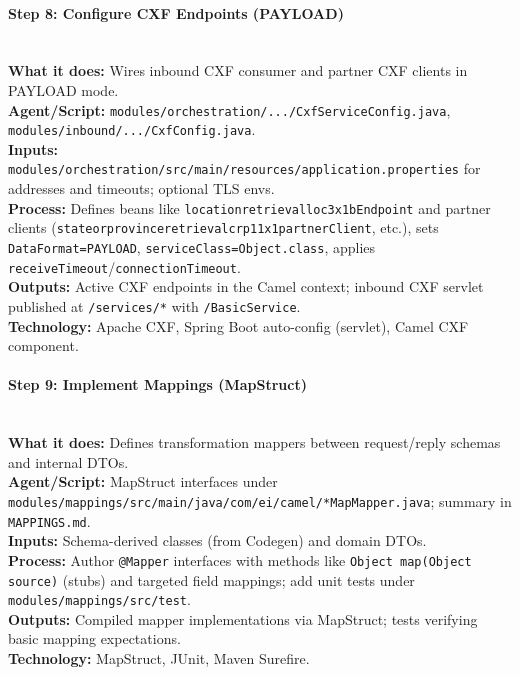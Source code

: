 \documentclass[11pt,a4paper]{article}
\begin{document}
\paragraph{Step 8: Configure CXF Endpoints (PAYLOAD)} \hfill\\
\textbf{What it does:} Wires inbound CXF consumer and partner CXF clients in PAYLOAD mode.\\
\textbf{Agent/Script:} \texttt{modules/orchestration/.../CxfServiceConfig.java}, \texttt{modules/inbound/.../CxfConfig.java}.\\
\textbf{Inputs:} \texttt{modules/orchestration/src/main/resources/application.properties} for addresses and timeouts; optional TLS envs.\\
\textbf{Process:} Defines beans like \texttt{locationretrievalloc3x1bEndpoint} and partner clients (\texttt{stateorprovinceretrievalcrp11x1partnerClient}, etc.), sets \texttt{DataFormat=PAYLOAD}, \texttt{serviceClass=Object.class}, applies \texttt{receiveTimeout}/\texttt{connectionTimeout}.\\
\textbf{Outputs:} Active CXF endpoints in the Camel context; inbound CXF servlet published at \texttt{/services/*} with \texttt{/BasicService}.\\
\textbf{Technology:} Apache CXF, Spring Boot auto-config (servlet), Camel CXF component.

\paragraph{Step 9: Implement Mappings (MapStruct)} \hfill\\
\textbf{What it does:} Defines transformation mappers between request/reply schemas and internal DTOs.\\
\textbf{Agent/Script:} MapStruct interfaces under \texttt{modules/mappings/src/main/java/com/ei/camel/*MapMapper.java}; summary in \texttt{MAPPINGS.md}.\\
\textbf{Inputs:} Schema-derived classes (from Codegen) and domain DTOs.\\
\textbf{Process:} Author \texttt{@Mapper} interfaces with methods like \texttt{Object map(Object source)} (stubs) and targeted field mappings; add unit tests under \texttt{modules/mappings/src/test}.\\
\textbf{Outputs:} Compiled mapper implementations via MapStruct; tests verifying basic mapping expectations.\\
\textbf{Technology:} MapStruct, JUnit, Maven Surefire.
\end{document}
